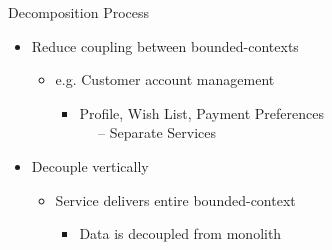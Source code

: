 \documentclass{slide}
\begin{document}
\begin{frame}{Decomposition Process}
\vspace{1pt}
{\huge
\begin{itemize}[<+->]
    \item Reduce coupling between bounded-contexts
    \vspace{1mm}
    \begin{itemize}[<1->]
        \LARGE\item e.g. Customer account management
        \begin{itemize}[<1->]
            \Large\item Profile, Wish List, Payment Preferences \\~~ -- Separate Services
        \end{itemize}
    \end{itemize}
    \vspace{3mm}
    \item Decouple vertically
    \vspace{1mm}
    \begin{itemize}[<2->]
        \LARGE\item Service delivers entire bounded-context
        \begin{itemize}[<2->]
            \Large\item Data is decoupled from monolith
        \end{itemize}
    \end{itemize}
\end{itemize}}
\end{frame}
\end{document}
